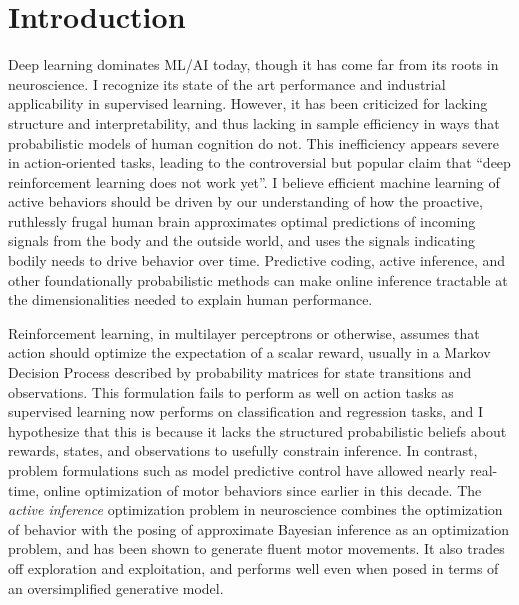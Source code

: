 \section*{Introduction}
\begin{singlespace}
\im
Deep learning dominates ML/AI today, though it has come far from its roots
in neuroscience\cite{hassabis2017neuroscience}.  I recognize its state of
the art performance and industrial applicability in supervised learning.
However, it has been criticized for lacking structure and interpretability,
and thus lacking in sample efficiency in ways that probabilistic models of
human cognition do not\cite{Lake2016}.  This inefficiency appears severe in
action-oriented tasks, leading to the controversial but popular claim that
``deep reinforcement learning does not work yet''\cite{rlblogpost}. I
believe efficient machine learning of active behaviors should be driven by
our understanding of how the proactive, ruthlessly frugal human brain
approximates optimal predictions of incoming signals from the body
and the outside world, and uses the signals indicating bodily needs to drive
behavior over time\cite{probmods,Clark2013}.  Predictive coding,
active inference, and other foundationally probabilistic methods can make
online inference tractable at the dimensionalities needed to explain human
performance\cite{Jonas2014,6386025}.
\end{singlespace}

\begin{singlespace}
Reinforcement learning, in multilayer perceptrons or otherwise, assumes that
action should optimize the expectation of a scalar reward, usually in a Markov
Decision Process described by probability matrices for state transitions and
observations.  This formulation fails to perform as well on action tasks as
supervised learning now performs on classification and regression tasks, and
I hypothesize that this is because it lacks the structured probabilistic
beliefs about rewards, states, and observations to usefully constrain
inference.  In contrast, problem formulations such as model predictive
control have allowed nearly real-time, online optimization of motor
behaviors since earlier in this decade\cite{6386025}.  The \emph{active inference}
optimization problem in neuroscience combines the optimization of behavior
with the posing of approximate Bayesian inference as an optimization
problem, and has been shown to generate fluent motor movements.  It also
trades off exploration and exploitation, and performs well even when posed
in terms of an oversimplified generative model\cite{Cullen2018}.
\end{singlespace}

